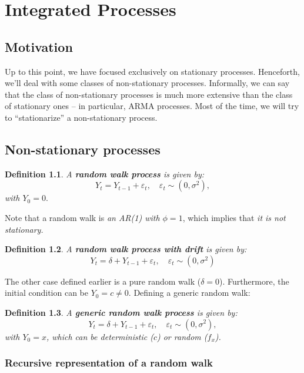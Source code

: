 \documentclass[11pt, a4paper]{report}
\theoremstyle{plain}
\theoremstyle{plain}
\newtheorem{defn}{Definition}[section]
\theoremstyle{remark}
\begin{document}
\chapter{Integrated Processes}

\section{Motivation}

Up to this point, we have focused exclusively on stationary processes. Henceforth, we'll deal with some classes of non-stationary processes. Informally, we can say that the class of non-stationary processes is much more extensive than the class of stationary ones -- in particular, ARMA processes. Most of the time, we will try to ``stationarize'' a non-stationary process.

\section{Non-stationary processes}

\begin{defn}
	A \textbf{random walk process} is given by:
	$$ Y_t = Y_{t-1} + \varepsilon_{t}, \hspace{1em} \varepsilon_{t} \sim (0, \sigma^2),$$
	with $Y_0 = 0.$
\end{defn}

Note that a random walk is \textit{an AR(1) with $\phi = 1$}, which implies that \textit{it is not stationary.}

\begin{defn}
	A \textbf{random walk process with drift} is given by:
	$$ Y_t = \delta + Y_{t-1} + \varepsilon_{t}, \hspace{1em} \varepsilon_{t} \sim (0, \sigma^2)$$
\end{defn}

The other case defined earlier is a pure random walk ($\delta = 0$). Furthermore, the initial condition can be $Y_0 = c \neq 0$. Defining a generic random walk:

\begin{defn}
	A \textbf{generic random walk process} is given by:
	$$ Y_t = \delta + Y_{t-1} + \varepsilon_{t}, \hspace{1em} \varepsilon_{t} \sim (0, \sigma^2),$$
	with $Y_0 = x$, which can be \textit{deterministic} ($c$) or \textit{random} ($f_x$).
\end{defn}

\subsection{Recursive representation of a random walk}
\end{document}
